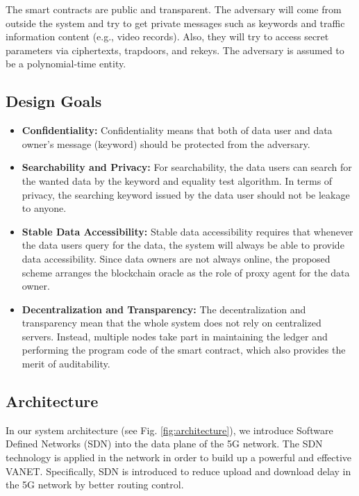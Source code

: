 \documentclass[journal]{IEEEtran}
\begin{document}
    The smart contracts are public and transparent. The adversary will come from outside the system and try to get private messages such as keywords and traffic information content (e.g., video records). Also, they will try to access secret parameters via ciphertexts, trapdoors, and rekeys. The adversary is assumed to be a polynomial-time entity.

    \subsection{Design Goals} 
    
\begin{itemize}
    \item \textbf{Confidentiality:}
    Confidentiality means that both of data user and data owner's message (keyword) should be protected from the adversary.
    
    \item \textbf{Searchability and Privacy:}
    For searchability, the data users can search for the wanted data by the keyword and equality test algorithm. In terms of privacy, the searching keyword issued by the data user should not be leakage to anyone.
    
    \item \textbf{Stable Data Accessibility:}
    Stable data accessibility requires that whenever the data users query for the data, the system will always be able to provide data accessibility. Since data owners are not always online, the proposed scheme arranges the blockchain oracle as the role of proxy agent for the data owner.
    
    \item \textbf{Decentralization and Transparency:}
    The decentralization and transparency mean that the whole system does not rely on centralized servers. Instead, multiple nodes take part in maintaining the ledger and performing the program code of the smart contract, which also provides the merit of auditability.
\end{itemize}

    \subsection{Architecture} 
    
    In our system architecture (see Fig. \ref{fig:architecture}), we introduce Software Defined Networks (SDN) into the data plane of the 5G network. The SDN technology is applied in the network in order to build up a powerful and effective VANET. Specifically, SDN is introduced to reduce upload and download delay in the 5G network by better routing control.
\end{document}
